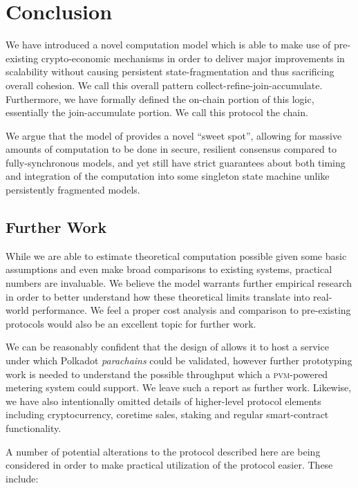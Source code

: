 \section{Conclusion}\label{sec:conclusion}

We have introduced a novel computation model which is able to make use of pre-existing crypto-economic mechanisms in order to deliver major improvements in scalability without causing persistent state-fragmentation and thus sacrificing overall cohesion. We call this overall pattern collect-refine-join-accumulate. Furthermore, we have formally defined the on-chain portion of this logic, essentially the join-accumulate portion. We call this protocol the \Jam chain.

We argue that the model of \Jam provides a novel ``sweet spot'', allowing for massive amounts of computation to be done in secure, resilient consensus compared to fully-synchronous models, and yet still have strict guarantees about both timing and integration of the computation into some singleton state machine unlike persistently fragmented models.

\subsection{Further Work}

While we are able to estimate theoretical computation possible given some basic assumptions and even make broad comparisons to existing systems, practical numbers are invaluable. We believe the model warrants further empirical research in order to better understand how these theoretical limits translate into real-world performance. We feel a proper cost analysis and comparison to pre-existing protocols would also be an excellent topic for further work.

We can be reasonably confident that the design of \Jam allows it to host a service under which Polkadot \emph{parachains} could be validated, however further prototyping work is needed to understand the possible throughput which a \textsc{pvm}-powered metering system could support. We leave such a report as further work. Likewise, we have also intentionally omitted details of higher-level protocol elements including cryptocurrency, coretime sales, staking and regular smart-contract functionality.

A number of potential alterations to the protocol described here are being considered in order to make practical utilization of the protocol easier. These include:

